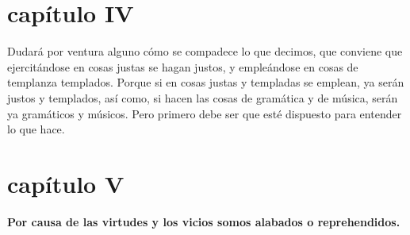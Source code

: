 \begin{multicols}{2}
\section*{capítulo IV}
Dudará por ventura alguno cómo se compadece lo que decimos, que conviene que ejercitándose en cosas justas se hagan justos, y empleándose en cosas de templanza templados. Porque si en cosas justas y
templadas se emplean, ya serán justos y templados, así como, si hacen las cosas de gramática y de música, serán ya gramáticos y músicos. Pero primero debe ser que esté dispuesto para entender lo que hace.\\

\section*{capítulo V}
\textbf{Por causa de las virtudes y los vicios somos alabados o reprehendidos.}\\


\end{multicols}

